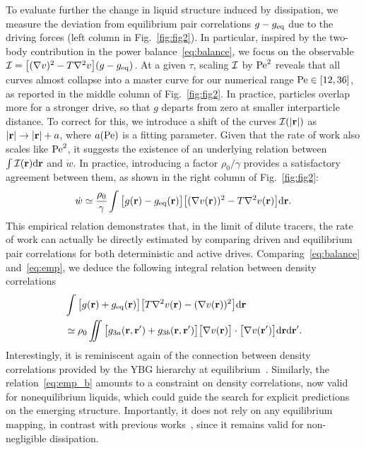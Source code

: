 \documentclass[superscriptaddress, twocolumn, prx, longbibliography, nofootinbib]{revtex4-1}
\newcommand{\dd}{\text{d}}
\begin{document}
To evaluate further the change in liquid structure induced by dissipation, we measure the deviation from equilibrium pair correlations $g-g_{\rm eq}$ due to the driving forces (left column in Fig.~\ref{fig:fig2}). In particular, inspired by the two-body contribution in the power balance~\eqref{eq:balance}, we focus on the observable ${\cal I} = \big[(\nabla v)^2-T\nabla^2v\big](g - g_{\rm eq})$. At a given $\tau$, scaling ${\cal I}$ by ${\rm Pe}^2$ reveals that all curves almost collapse into a master curve for our numerical range ${\rm Pe}\in[12,36]$, as reported in the middle column of Fig.~\ref{fig:fig2}. In practice, particles overlap more for a stronger drive, so that $g$ departs from zero at smaller interparticle distance. To correct for this, we introduce a shift of the curves ${\cal I}(|{\bf r}|)$ as $|{\bf r}|\to |{\bf r}|+a$, where $a(\rm Pe)$ is a fitting parameter. Given that the rate of work also scales like ${\rm Pe}^2$, it suggests the existence of an underlying relation between $\int{\cal I}({\bf r}){\rm d}{\bf r}$ and $\dot w$. In practice, introducing a factor $\rho_0/\gamma$ provides a satisfactory agreement between them, as shown in the right column of Fig.~\ref{fig:fig2}:
\begin{equation}\label{eq:emp}
	\dot w \simeq \frac{\rho_0}{\gamma} \int \big[ g({\bf r}) - g_{\rm eq}({\bf r}) \big]\big[(\nabla v({\bf r}))^2-T\nabla^2v({\bf r})\big] {\rm d}{\bf r} . 
\end{equation}
This empirical relation demonstrates that, in the limit of dilute tracers, the rate of work can actually be directly estimated by comparing driven and equilibrium pair correlations for both deterministic and active drives. Comparing~\eqref{eq:balance} and~\eqref{eq:emp}, we deduce the following integral relation between density correlations
\begin{equation}\label{eq:emp_b}
	\begin{aligned}
		&\int \big[ g({\bf r}) + g_{\rm eq}({\bf r}) \big] \big[T \nabla^2 v({\bf r}) - (\nabla v({\bf r}))^2\big] \dd{\bf r}
		\\
		& \simeq \rho_0 \iint\big[ g_{3a}({\bf r}, {\bf r}') + g_{3b}({\bf r}, {\bf r}')\big]  \big[\nabla v({\bf r})\big] \cdot \big[\nabla v({\bf r}')\big] \dd{\bf r} \dd{\bf r}' .
	\end{aligned}
\end{equation}
Interestingly, it is reminiscent again of the connection between density correlations provided by the YBG hierarchy at equilibrium~\cite{Hansen2013}. Similarly, the relation~\eqref{eq:emp_b} amounts to a constraint on density correlations, now valid for nonequilibrium liquids, which could guide the search for explicit predictions on the emerging structure. Importantly, it does not rely on any equilibrium mapping, in contrast with previous works~\cite{Maggi2015b, Rein2016, Wittmann2017}, since it remains valid for non-negligible dissipation.
\end{document}

